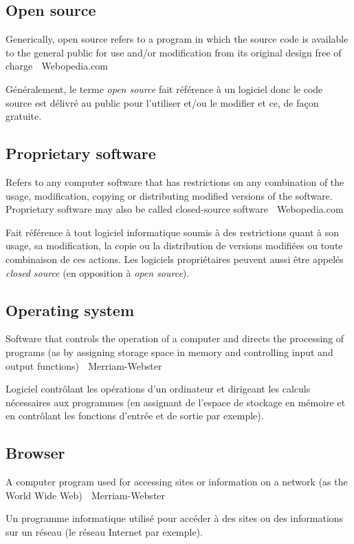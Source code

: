 \documentclass[12pt]{article}
\begin{document}
\subsection*{Open source}

{\color{bg}Generically, open source refers to a program in which the
  source code is available to the general public for use and/or
  modification from its original design free of charge \textemdash
  $\;$ Webopedia.com }

Généralement, le terme \textit{open source} fait référence à un
logiciel donc le code source est délivré au public pour l'utiliser
et/ou le modifier et ce, de façon gratuite.

\subsection*{Proprietary software}

{\color{bg}Refers to any computer software that has restrictions on
  any combination of the usage, modification, copying or distributing
  modified versions of the software. Proprietary software may also be
  called closed-source software \textemdash $\;$ Webopedia.com }

Fait référence à tout logiciel informatique soumis à des restrictions
quant à son usage, sa modification, la copie ou la distribution de
versions modifiées ou toute combinaison de ces actions. Les logiciels
propriétaires peuvent aussi être appelés \textit{closed source} (en
opposition à \textit{open source}).

\subsection*{Operating system}

{\color{bg}Software that controls the operation of a computer and
  directs the processing of programs (as by assigning storage space in
  memory and controlling input and output functions) \textemdash $\;$
  Merriam-Webster }

Logiciel contrôlant les opérations d'un ordinateur et dirigeant les
calculs nécessaires aux programmes (en assignant de l'espace de
stockage en mémoire et en contrôlant les fonctions d'entrée et de
sortie par exemple).

\subsection*{Browser}

{\color{bg}A computer program used for accessing sites or information
  on a network (as the World Wide Web) \textemdash $\;$
  Merriam-Webster }

Un programme informatique utilisé pour accéder à des sites ou des
informations sur un réseau (le réseau Internet par exemple).



\end{document}
